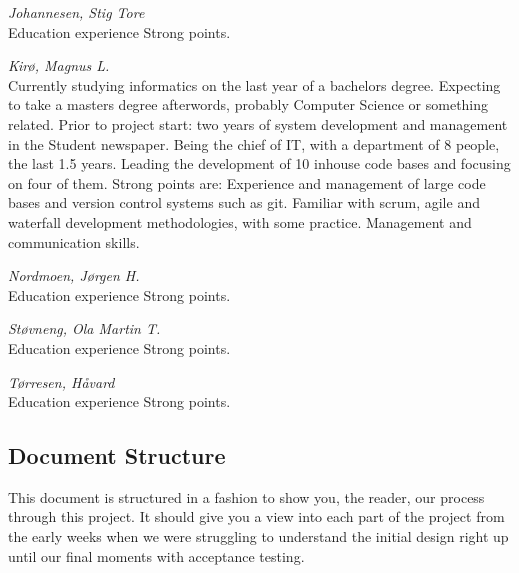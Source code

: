     \begin{Student}
    \textit{Johannesen, Stig Tore} \\
        Education
        experience
        Strong points.
        \\
    \end{Student}
    
    \begin{Student}
    \textit{Kirø, Magnus L.} \\
        Currently studying informatics on the last year of a bachelors degree. Expecting to take a  masters degree afterwords, probably Computer Science or something related. 
        Prior to project start: two years of system development and management in the Student newspaper. Being the chief of IT, with a department of 8 people, the last 1.5 years. Leading the development of 10 inhouse code bases and focusing on four of them. 
        Strong points are: Experience and management of large code bases and version control systems such as git. Familiar with scrum, agile and waterfall development methodologies, with some practice. Management and communication skills. 
        \\
    \end{Student}
    
    \begin{Student}
    \textit{Nordmoen, Jørgen H.} \\
        Education
        experience
        Strong points.
        \\
    \end{Student}
    
    \begin{Student}
    \textit{Støvneng, Ola Martin T. } \\
        Education
        experience
        Strong points.
        \\
    \end{Student}
    
    \begin{Student}
    \textit{Tørresen, Håvard } \\
        Education
        experience
        Strong points.
        \\
    \end{Student}
    
    \subsection{Document Structure}\label{Document Structure}
    This document is structured in a fashion to show you, the reader, our process through this project. It should give you a view into each part of the project from the early weeks when we were struggling to understand the initial design right up until our final moments with acceptance testing. 
    
